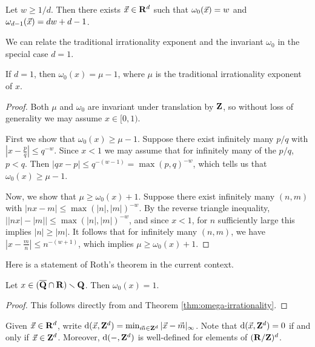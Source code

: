 \begin{theorem}\label{thm:jarnik}
Let $w\geqslant 1/d$. Then there exists $\vec{x}\in \mathbf{R}^d$ such that 
$\omega_0(\vec{x})=w$ and $\omega_{d-1}(\vec{x}) = d w+d-1$. 
\end{theorem}

We can relate the traditional irrationality exponent and the invariant 
$\omega_0$ in the special case $d = 1$. 

\begin{theorem}\label{thm:omega-irrationality}
If $d=1$, then $\omega_0(x) = \mu-1$, where $\mu$ is the 
traditional irrationality exponent of $x$. 
\end{theorem}
\begin{proof}
Both $\mu$ and $\omega_0$ are invariant under translation by $\mathbf{Z}$, so without 
loss of generality we may assume $x\in [0,1)$. 

First we show that $\omega_0(x)\geqslant \mu-1$. Suppose there exist infinitely 
many $p/q$ with $\left| x - \frac p q\right| \leqslant q^{-w}$. Since $x<1$ we 
may assume that for infinitely many of the $p/q$, $p<q$. Then 
$| q x - p| \leqslant q^{-(w - 1)} = \max(p,q)^{-w}$, which tells us that 
$\omega_0(x) \geqslant \mu - 1$. 

Now, we show that $\mu \geqslant \omega_0(x) + 1$. Suppose there exist 
infinitely many $(n,m)$ with $|n x - m| \leqslant \max(|n|,|m|)^{-w}$. By the 
reverse triangle inequality, 
$\left| |n x| - |m|\right| \leqslant \max(|n|,|m|)^{-w}$, and since 
$x<1$, for $n$ sufficiently large this implies $|n| \geqslant |m|$. It follows 
that for infinitely many $(n,m)$, we have 
$\left| x - \frac m n\right| \leqslant n^{-(w + 1)}$, which implies 
$\mu \geqslant \omega_0(x) + 1$. 
\end{proof}

Here is a statement of Roth's theorem in the current context. 

\begin{theorem}[Roth]
Let $x\in (\overline{\mathbf{Q}}\cap \mathbf{R})\smallsetminus \mathbf{Q}$. Then 
$\omega_0(x) = 1$. 
\end{theorem}
\begin{proof}
This follows directly from \cite{roth-1955} and Theorem 
\ref{thm:omega-irrationality}.
\end{proof}

Given $\vec{x}\in \mathbf{R}^d$, write 
$\mathrm{d}(\vec{x},\mathbf{Z}^d)=\min_{\vec{m}\in \mathbf{Z}^d} |\vec{x}-\vec{m}|_\infty$. Note that 
$\mathrm{d}(\vec{x},\mathbf{Z}^d)=0$ if and only if $\vec{x}\in \mathbf{Z}^d$. Moreover, $\mathrm{d}(-,\mathbf{Z}^d)$ 
is well-defined for elements of $(\mathbf{R}/\mathbf{Z})^d$. 


